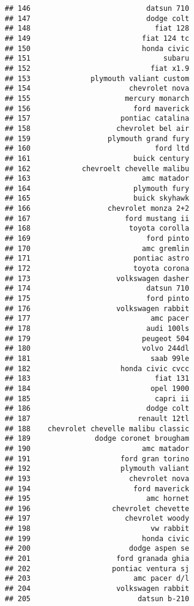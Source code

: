 \documentclass[
]{article}
\begin{document}
\begin{verbatim}
## 146                           datsun 710
## 147                           dodge colt
## 148                             fiat 128
## 149                          fiat 124 tc
## 150                          honda civic
## 151                               subaru
## 152                            fiat x1.9
## 153              plymouth valiant custom
## 154                       chevrolet nova
## 155                      mercury monarch
## 156                        ford maverick
## 157                     pontiac catalina
## 158                    chevrolet bel air
## 159                  plymouth grand fury
## 160                             ford ltd
## 161                        buick century
## 162            chevroelt chevelle malibu
## 163                          amc matador
## 164                        plymouth fury
## 165                        buick skyhawk
## 166                  chevrolet monza 2+2
## 167                      ford mustang ii
## 168                       toyota corolla
## 169                           ford pinto
## 170                          amc gremlin
## 171                        pontiac astro
## 172                        toyota corona
## 173                    volkswagen dasher
## 174                           datsun 710
## 175                           ford pinto
## 176                    volkswagen rabbit
## 177                            amc pacer
## 178                           audi 100ls
## 179                          peugeot 504
## 180                          volvo 244dl
## 181                            saab 99le
## 182                     honda civic cvcc
## 183                             fiat 131
## 184                            opel 1900
## 185                             capri ii
## 186                           dodge colt
## 187                         renault 12tl
## 188    chevrolet chevelle malibu classic
## 189               dodge coronet brougham
## 190                          amc matador
## 191                     ford gran torino
## 192                     plymouth valiant
## 193                       chevrolet nova
## 194                        ford maverick
## 195                           amc hornet
## 196                   chevrolet chevette
## 197                      chevrolet woody
## 198                            vw rabbit
## 199                          honda civic
## 200                       dodge aspen se
## 201                    ford granada ghia
## 202                   pontiac ventura sj
## 203                        amc pacer d/l
## 204                    volkswagen rabbit
## 205                         datsun b-210

\end{verbatim}
\end{document}
